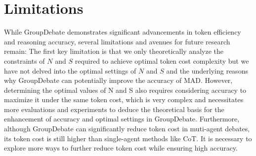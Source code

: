 \section{Limitations}
\label{sec:Limitations}
While GroupDebate demonstrates significant advancements in token efficiency and reasoning accuracy, several limitations and avenues for future research remain:
The first key limitation is that we only theoretically analyze the constraints of $N$ and $S$ required to achieve optimal token cost complexity but we have not delved into the optimal settings of $N$ and $S$ and the underlying reasons why GroupDebate can potentially improve the accuracy of MAD.  However, determining the optimal values of N and S also requires considering accuracy to maximize it under the same token cost, which is very complex and necessitates more evaluations and experiments to deduce the theoretical basis for the enhancement of accuracy and optimal settings in GroupDebate.
Furthermore, although GroupDebate can significantly reduce token cost in muti-agent debates, its token cost is still higher than single-agent methods like CoT. It is necessary to explore more ways to further reduce token cost while ensuring high accuracy.